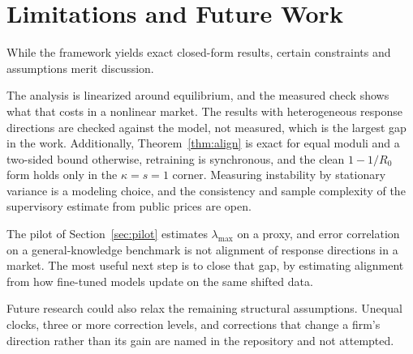 \documentclass[conference]{IEEEtran}
\theoremstyle{definition}
\newcommand{\lmax}{\lambda_{\max}}
\begin{document}
\section{Limitations and Future Work}\label{sec:limits}
While the framework yields exact closed-form results, certain constraints and
assumptions merit discussion.

The analysis is linearized around equilibrium, and the measured check shows
what that costs in a nonlinear market. The results with heterogeneous response
directions are checked against the model, not measured, which is the largest
gap in the work. Additionally, Theorem~\ref{thm:align} is exact for equal
moduli and a two-sided bound otherwise, retraining is synchronous, and the
clean $1 - 1/R_0$ form holds only in the $\kappa = s = 1$ corner. Measuring
instability by stationary variance is a modeling choice, and the consistency
and sample complexity of the supervisory estimate from public prices are open.

The pilot of Section~\ref{sec:pilot} estimates $\lmax$ on a proxy, and
error correlation on a general-knowledge benchmark is not alignment of
response directions in a market. The most useful next step is to close that
gap, by estimating alignment from how fine-tuned models update on the same
shifted data.

Future research could also relax the remaining structural assumptions. Unequal
clocks, three or more correction levels, and corrections that change a firm's
direction rather than its gain are named in the repository and not attempted.
\end{document}
